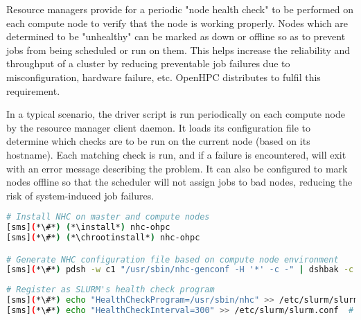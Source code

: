 Resource managers provide for a periodic "node health check" to be performed on
each compute node to verify that the node is working properly. Nodes which are
determined to be "unhealthy" can be marked as down or offline so as to prevent
jobs from being scheduled or run on them. This helps increase the reliability
and throughput of a cluster by reducing preventable job failures due to
misconfiguration, hardware failure, etc. OpenHPC distributes \nhc{} to fulfil
this requirement. 

In a typical scenario, the \nhc{} driver script is run periodically on each compute
node by the resource manager client daemon. It loads its
configuration file to determine which checks are to be run on the current node
(based on its hostname). Each matching check is run, and if a failure is
encountered, \nhc{} will exit with an error message describing the problem. It can
also be configured to mark nodes offline so that the scheduler will not assign
jobs to bad nodes, reducing the risk of system-induced job failures. 

\begin{lstlisting}[language=bash,keywords={},upquote=true]
# Install NHC on master and compute nodes
[sms](*\#*) (*\install*) nhc-ohpc
[sms](*\#*) (*\chrootinstall*) nhc-ohpc

# Generate NHC configuration file based on compute node environment
[sms](*\#*) pdsh -w c1 "/usr/sbin/nhc-genconf -H '*' -c -" | dshbak -c > /etc/nhc/nhc.conf.new

\end{lstlisting}

\begin{lstlisting}[language=bash,keywords={},upquote=true]
# Register as SLURM's health check program
[sms](*\#*) echo "HealthCheckProgram=/usr/sbin/nhc" >> /etc/slurm/slurm.conf
[sms](*\#*) echo "HealthCheckInterval=300" >> /etc/slurm/slurm.conf  # execute every five minutes
\end{lstlisting}
\fi

